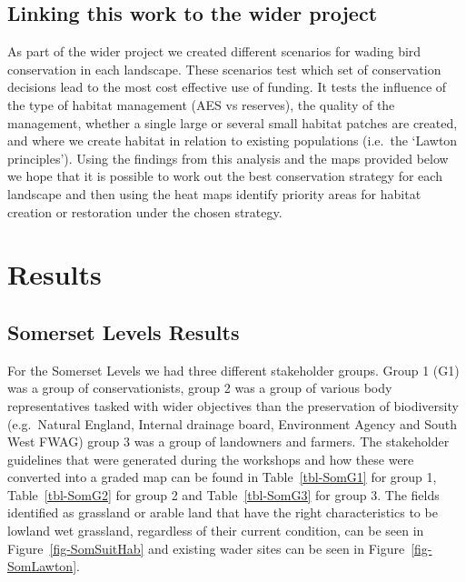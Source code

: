 \documentclass[
  12pt,
  letterpaper,
  DIV=11,
  numbers=noendperiod]{scrartcl}
\begin{document}
\subsection{Linking this work to the wider
project}\label{linking-this-work-to-the-wider-project}

As part of the wider project we created different scenarios for wading
bird conservation in each landscape. These scenarios test which set of
conservation decisions lead to the most cost effective use of funding.
It tests the influence of the type of habitat management (AES vs
reserves), the quality of the management, whether a single large or
several small habitat patches are created, and where we create habitat
in relation to existing populations (i.e.~the `Lawton principles').
Using the findings from this analysis and the maps provided below we
hope that it is possible to work out the best conservation strategy for
each landscape and then using the heat maps identify priority areas for
habitat creation or restoration under the chosen strategy.

\section{Results}\label{results}

\subsection{Somerset Levels Results}\label{somerset-levels-results}

For the Somerset Levels we had three different stakeholder groups. Group
1 (G1) was a group of conservationists, group 2 was a group of various
body representatives tasked with wider objectives than the preservation
of biodiversity (e.g.~Natural England, Internal drainage board,
Environment Agency and South West FWAG) group 3 was a group of
landowners and farmers. The stakeholder guidelines that were generated
during the workshops and how these were converted into a graded map can
be found in Table~\ref{tbl-SomG1} for group 1, Table~\ref{tbl-SomG2} for
group 2 and Table~\ref{tbl-SomG3} for group 3. The fields identified as
grassland or arable land that have the right characteristics to be
lowland wet grassland, regardless of their current condition, can be
seen in Figure~\ref{fig-SomSuitHab} and existing wader sites can be seen
in Figure~\ref{fig-SomLawton}.
\end{document}
